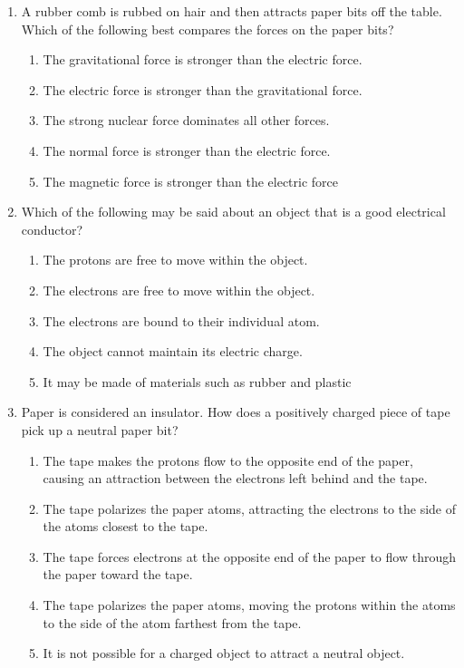 \documentclass{../../../oss-apphys}
\begin{document}
\begin{multicols*}{2}
\begin{enumerate}[leftmargin=18pt]
  \item A rubber comb is rubbed on hair and then attracts paper bits off the
    table. Which of the following best compares the forces on the paper bits?
    \begin{enumerate}[nosep,leftmargin=18pt,label=(\Alph*)]
    \item The gravitational force is stronger than the electric force.
    \item The electric force is stronger than the gravitational force.
    \item The strong nuclear force dominates all other forces.
    \item The normal force is stronger than the electric force.
    \item The magnetic force is stronger than the electric force
    \end{enumerate}
    \columnbreak
    
  \item Which of the following may be said about an object that is a good
    electrical conductor?
    \begin{enumerate}[nosep,leftmargin=18pt,label=(\Alph*)]
    \item The protons are free to move within the object.
    \item The electrons are free to move within the object.
    \item The electrons are bound to their individual atom.
    \item The object cannot maintain its electric charge.
    \item It may be made of materials such as rubber and plastic
    \end{enumerate}
    
  \item Paper is considered an insulator. How does a positively charged piece
    of tape pick up a neutral paper bit?
     \begin{enumerate}[nosep,leftmargin=18pt,label=(\Alph*)]
     \item The tape makes the protons flow to the opposite end of the paper,
       causing an attraction between the electrons left behind and the tape.
     \item The tape polarizes the paper atoms, attracting the electrons to the
       side of the atoms closest to the tape.
     \item The tape forces electrons at the opposite end of the paper to flow
       through the paper toward the tape.
     \item The tape polarizes the paper atoms, moving the protons within the
       atoms to the side of the atom farthest from the tape.
     \item It is not possible for a charged object to attract a neutral object.
     \end{enumerate}
     

\end{enumerate}
\end{multicols*}
\end{document}
